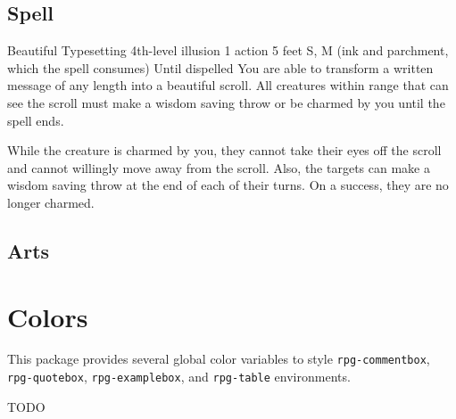 \documentclass[10pt,a4paper,openany]{book}
\begin{document}
\section{Spell}
\begin{rpg-spell}
	{Beautiful Typesetting}
	{4th-level illusion}
	{1 action}
	{5 feet}
	{S, M (ink and parchment, which the spell consumes)}
	{Until dispelled}
	You are able to transform a written message of any length into a beautiful scroll. All creatures within range that can see the scroll must make a wisdom saving throw or be charmed by you until the spell ends.

	While the creature is charmed by you, they cannot take their eyes off the scroll and cannot willingly move away from the scroll. Also, the targets can make a wisdom saving throw at the end of each of their turns. On a success, they are no longer charmed.
\end{rpg-spell}

\section{Arts}


\lipsum

\chapter{Colors}

This package provides several global color variables to style \lstinline!rpg-commentbox!, \lstinline!rpg-quotebox!, \lstinline!rpg-examplebox!, and \lstinline!rpg-table! environments.


TODO
\end{document}
